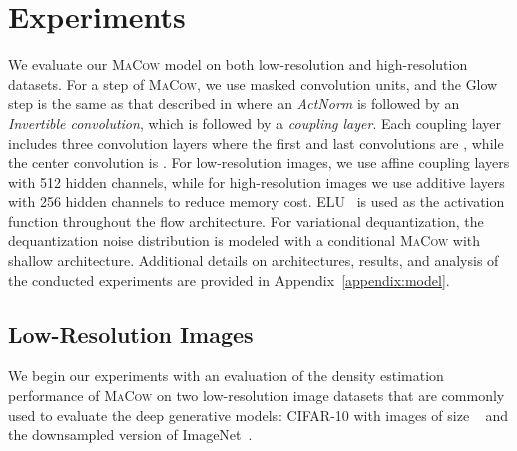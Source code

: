 \documentclass{article}
\begin{document}
\section{Experiments}\label{sec:experiment}
We evaluate our \textsc{MaCow} model on both low-resolution and high-resolution datasets. 
For a step of \textsc{MaCow}, we use  masked convolution units, and the Glow step is the same as that described in \citet{kingma2018glow} where an \emph{ActNorm} is followed by an \emph{Invertible  convolution}, which is followed by a \emph{coupling layer}. 
Each coupling layer includes three convolution layers where the first and last convolutions are , while the center convolution is .
For low-resolution images, we use affine coupling layers with 512 hidden channels, while for high-resolution images we use additive layers with 256 hidden channels to reduce memory cost.
ELU~\citep{clevert2015elu} is used as the activation function throughout the flow architecture.
For variational dequantization, the dequantization noise distribution  is modeled with a conditional \textsc{MaCow} with shallow architecture.
Additional details on architectures, results, and analysis of the conducted experiments are provided in Appendix~\ref{appendix:model}.

\subsection{Low-Resolution Images}
We begin our experiments with an evaluation of the density estimation performance of \textsc{MaCow} on two low-resolution image datasets that are commonly used to evaluate the deep generative models: CIFAR-10 with images of size ~\citep{krizhevsky2009learning} and the  downsampled version of ImageNet~\citep{oord2016pixel}.
\end{document}

